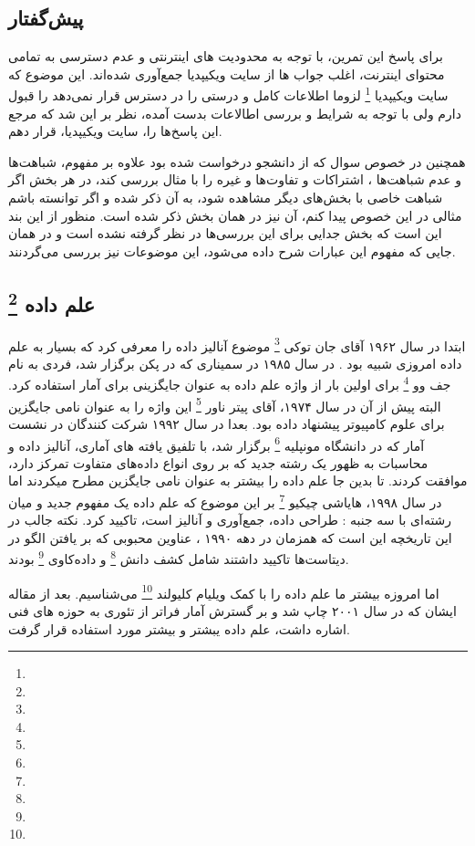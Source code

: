 \documentclass[a4paper, 12pt]{article}
\begin{document}
\subsection*{پیش‌گفتار}
	برای پاسخ این تمرین، با توجه به محدودیت های اینترنتی و عدم دسترسی به تمامی محتوای اینترنت، اغلب جواب ها از سایت ویکیپدیا جمع‌آوری شده‌اند. این موضوع که سایت ویکیپدیا
	\footnote{}
	 لزوما اطلاعات کامل و درستی را در دسترس قرار نمی‌دهد را قبول دارم ولی با توجه به شرایط و بررسی اطالاعات بدست آمده، نظر بر این شد که مرجع این پاسخ‌ها را، سایت ویکیپدیا، قرار دهم. 

همچنین در خصوص سوال که از دانشجو درخواست شده بود علاوه بر مفهوم، شباهت‌ها و عدم شباهت‌ها ، اشتراکات و تفاوت‌ها و غیره را با مثال بررسی کند، در هر بخش اگر شباهت خاصی با بخش‌های دیگر مشاهده شود، به آن ذکر شده و اگر توانسته باشم مثالی در این خصوص پیدا کنم، آن نیز در همان بخش ذکر شده است. منظور از این بند این است که بخش جدایی برای این بررسی‌ها در نظر گرفته نشده است و در همان جایی که مفهوم این عبارات شرح داده می‌شود، این موضوعات نیز بررسی می‌گردنند. 
\subsection*{
	علم داده
	\footnote{}
}
ابتدا در سال ۱۹۶۲ آقای جان توکی
\footnote{}
موضوع آنالیز داده را معرفی کرد که بسیار به علم داده امروزی شبیه بود . در سال ۱۹۸۵ در سمیناری که در پکن برگزار شد، فردی به نام جف وو 
\footnote{}
برای اولین بار از واژه علم داده به عنوان جایگزینی برای آمار استفاده کرد. البته پیش از آن در سال ۱۹۷۴، 
آقای پیتر ناور
\footnote{}
این واژه را به عنوان نامی جایگزین برای علوم کامپیوتر پیشنهاد داده بود.
 بعدا در سال ۱۹۹۲ شرکت کنندگان در نشست آمار که در دانشگاه مونپلیه 
\footnote{}
برگزار شد، با تلفیق یافته های آماری، آنالیز داده و محاسبات به ظهور یک رشته جدید که بر روی انواع داده‌های متفاوت تمرکز دارد، موافقت کردند. 
تا بدین جا علم داده را بیشتر به عنوان نامی جایگزین مطرح میکردند اما در سال ۱۹۹۸، هایاشی چیکیو
\footnote{} 
بر این موضوع که علم داده یک مفهوم جدید و میان رشته‌ای با سه جنبه : طراحی داده، جمع‌آوری و آنالیز است، تاکیید کرد.
نکته جالب در این تاریخچه این است که همزمان در دهه ۱۹۹۰ ، عناوین محبوبی که بر یافتن الگو در دیتاست‌ها تاکیید داشتند شامل کشف دانش 
\footnote{}
و داده‌کاوی
\footnote{}
بودند.


اما امروزه بیشتر ما علم داده را با کمک ویلیام کلیولند 
\footnote{}
می‌شناسیم. بعد از مقاله ایشان که در سال ۲۰۰۱ چاپ شد و بر گسترش آمار فراتر از تئوری به حوزه های فنی اشاره داشت، علم داده یبشتر و بیشتر مورد استفاده قرار گرفت. 
\end{document}
